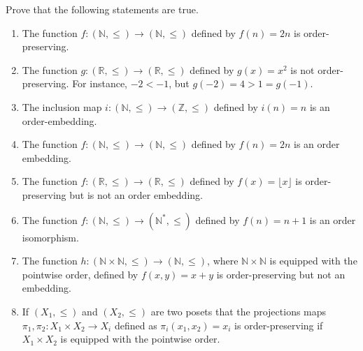 \documentclass[11pt,a4paper]{exam}
\newcommand{\Z}{\mathbb{Z}}
\newcommand{\R}{\mathbb{R}}
\newcommand{\N}{\mathbb{N}}
\begin{document}
\begin{exo}
    Prove that the following statements are true.
    \begin{enumerate}
        \item The function $f \colon (\N, \leq) \rightarrow (\N,\leq)$ defined by $f(n) = 2n$ is order-preserving.
        \item The function $g \colon (\R, \leq) \rightarrow (\R, \leq)$ defined by $g(x) = x^2$ is not order-preserving. For instance, $-2 < -1$, but $g(-2) = 4 > 1 = g(-1)$.
        \item The inclusion map $i \colon (\N, \leq) \rightarrow (\Z, \leq)$ defined by $i(n) = n$ is an order-embedding.
        \item The function $f \colon (\N, \leq) \rightarrow (\N, \leq)$ defined by $f(n) = 2n$ is an order embedding.
        \item The function $f \colon (\R, \leq) \rightarrow (\R, \leq)$ defined by $f(x) = \lfloor x \rfloor$ is order-preserving but is not an order embedding.
        \item The function $f \colon (\N, \leq) \rightarrow (\N^{*}, \leq)$ defined by $f(n) = n + 1$ is an order isomorphism.
        \item The function $h \colon (\N \times \N, \leq) \rightarrow (\N, \leq)$, where $\N \times \N$ is equipped with the pointwise order, defined by $f(x,y) = x + y$ is order-preserving but not an embedding.
        \item If $(X_1, \leq)$ and $(X_2, \leq)$ are two posets that the projections maps $\pi_1, \pi_2 \colon X_1 \times X_2 \rightarrow X_i$ defined as $\pi_i(x_1,x_2) = x_i$ is order-preserving if $X_1 \times X_2$ is equipped with the pointwise order.
    \end{enumerate}


\end{exo}
\end{document}
